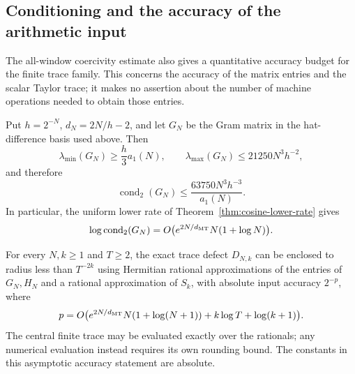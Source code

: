 \subsection{Conditioning and the accuracy of the arithmetic input}
\label{subsec:fd-arithmetic-precision}

The all-window coercivity estimate also gives a quantitative accuracy
budget for the finite trace family. This concerns the accuracy of the
matrix entries and the scalar Taylor trace; it makes no assertion
about the number of machine operations needed to obtain those entries.

\begin{proposition}
\label{prop:fd-arithmetic-precision}
Put \(h=2^{-N}\), \(d_N=2N/h-2\), and let \(G_N\) be the
Gram matrix in the hat-difference basis used above. Then
\[
 \lambda_{\min}(G_N)\ge \frac h3 a_1(N),\qquad
 \lambda_{\max}(G_N)\le21250N^3h^{-2},
\]
and therefore
\[
 \operatorname{cond}_2(G_N)
 \le\frac{63750N^3h^{-3}}{a_1(N)}.
\]
In particular, the uniform lower rate of
Theorem~\ref{thm:cosine-lower-rate} gives
\[
 \log\operatorname{cond}_2(G_N)
 =O\bigl(e^{2N/d_{\rm MT}}N(1+\log N)\bigr).
\]

For every \(N,k\ge1\) and \(T\ge2\), the exact trace defect
\(D_{N,k}\) can be enclosed to radius less than \(T^{-2k}\)
using Hermitian rational approximations of the entries of \(G_N,H_N\)
and a rational approximation of \(S_k\), with absolute input
accuracy \(2^{-p}\), where
\[
 p=O\bigl(e^{2N/d_{\rm MT}}N(1+\log(N+1))
                  +k\log T+\log(k+1)\bigr).
\]
The central finite trace may be evaluated exactly over the rationals;
any numerical evaluation instead requires its own rounding bound.
The constants in this asymptotic accuracy statement are absolute.
\end{proposition}

